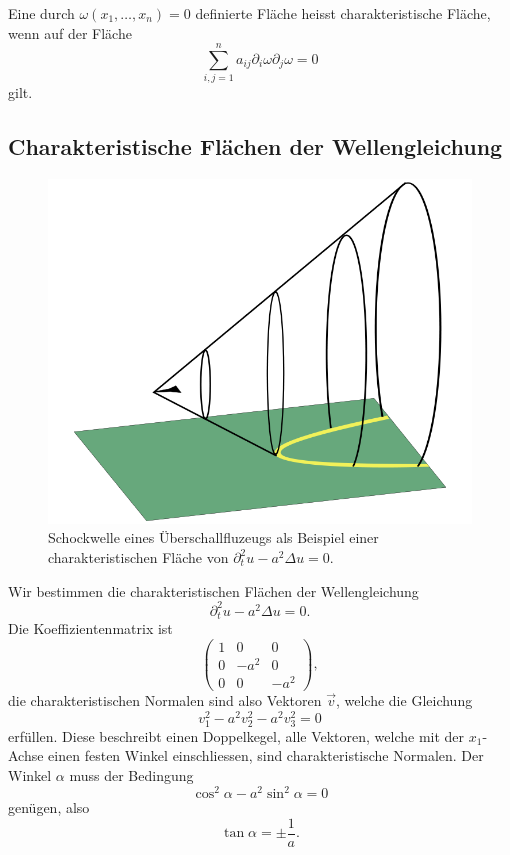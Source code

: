 \begin{definition}
Eine durch $\omega(x_1,\dots,x_n)=0$ definierte Fläche heisst
charakteristische Fläche, wenn auf der Fläche
\[
\sum_{i,j=1}^na_{ij}\partial_i\omega\partial_j\omega=0
\]
gilt.
\end{definition}

\subsection{Charakteristische Flächen der Wellengleichung}
\begin{figure}
\begin{center}
\includegraphics[width=0.8\hsize]{../common/graphics/shock}
\end{center}
\caption{Schockwelle eines Überschallfluzeugs als Beispiel einer
charakteristischen Fläche von $\partial_t^2u-a^2\Delta u=0$.\label{ueberschallkegel}}
\end{figure}
Wir bestimmen die charakteristischen Flächen der
Wellengleichung
\[
\partial_t^2u-a^2\Delta u=0.
\]
Die Koeffizientenmatrix ist
\[
\begin{pmatrix}
1&0&0\\
0&-a^2&0\\
0&0&-a^2
\end{pmatrix},
\]
die charakteristischen Normalen sind also Vektoren $\vec v$, welche die
Gleichung
\[
v_1^2-a^2v_2^2-a^2v_3^2=0
\]
erfüllen. Diese beschreibt einen Doppelkegel, alle Vektoren, welche mit
der $x_1$-Achse einen festen Winkel einschliessen, sind charakteristische
Normalen. Der Winkel $\alpha$ muss der Bedingung
\[
\cos^2\alpha-a^2\sin^2\alpha=0
\]
genügen, also
\[
\tan\alpha=\pm\frac1a.
\]

